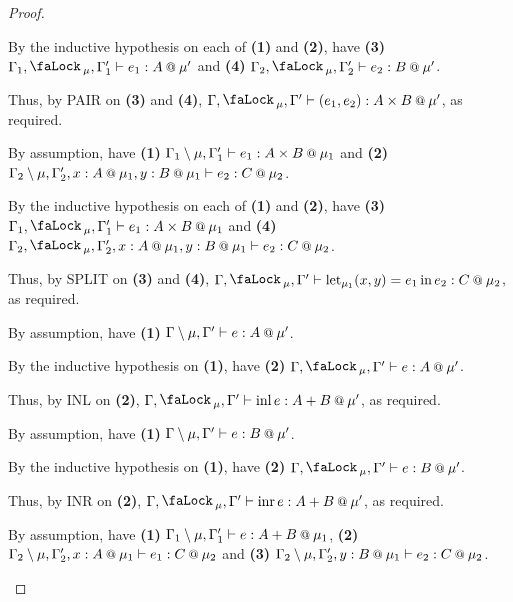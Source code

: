 \documentclass[acmsmall,screen,nonacm]{acmart}
\makeatletter
\DeclareMathOperator{\llet}{\text{let}}
\DeclareMathOperator{\lin}{\text{in}}
\newcommand{\at}{\mathbin{\mbox{\small\ensuremath{@}}}}
\DeclareMathOperator{\inl}{\text{inl}}
\DeclareMathOperator{\inr}{\text{inr}}
\newcommand{\tee}{\vdash}
\DeclareMathOperator{\lock}{\tikz{\node[scale=1, line width=0pt, inner sep=0pt] at (0,0) {\faLock\,};}}
\makeatother
\begin{document}
\begin{proof}
\begin{description}
    By the inductive hypothesis on each of \textbf{(1)} and \textbf{(2)}, have \textbf{(3)} $\Gamma_1, \lock_\mu, \Gamma^\prime_1 \tee e_1 : A \at \mu^\prime$ and \textbf{(4)} $\Gamma_2, \lock_\mu, \Gamma^\prime_2 \tee e_2 : B \at \mu^\prime$. 
    
    Thus, by PAIR on \textbf{(3)} and \textbf{(4)}, $\Gamma, \lock_\mu, \Gamma^\prime \tee (e_1, e_2) : A \times B \at \mu^\prime$, as required.
    \\
    \item[Case SPLIT.]
    By assumption, have \textbf{(1)} $\Gamma_1 \setminus \mu, \Gamma^\prime_1 \tee e_1 : A \times B \at \mu_1$ and \textbf{(2)} $\Gamma_2 \setminus \mu, \Gamma^\prime_2, x : A \at \mu_1, y : B \at \mu_1 \tee e_2 : C \at \mu_2$. 
    
    By the inductive hypothesis on each of \textbf{(1)} and \textbf{(2)}, have \textbf{(3)} $\Gamma_1, \lock_\mu, \Gamma^\prime_1 \tee e_1 : A \times B \at \mu_1$ and \textbf{(4)} $\Gamma_2, \lock_\mu, \Gamma^\prime_2, x : A \at \mu_1, y : B \at \mu_1 \tee e_2 : C \at \mu_2$. 
    
    Thus, by SPLIT on \textbf{(3)} and \textbf{(4)}, $\Gamma, \lock_\mu, \Gamma^\prime \tee \llet_{\mu_1} (x, y) = e_1 \lin e_2 : C \at \mu_2$, as required.
    \\
    \item[Case INL.]
    By assumption, have \textbf{(1)} $\Gamma \setminus \mu, \Gamma^\prime \tee e : A \at \mu^\prime$. 
    
    By the inductive hypothesis on \textbf{(1)}, have \textbf{(2)} $\Gamma, \lock_\mu, \Gamma^\prime \tee e : A \at \mu^\prime$. 
    
    Thus, by INL on \textbf{(2)}, $\Gamma, \lock_\mu, \Gamma^\prime \tee \inl e : A + B \at \mu^\prime$, as required.
    \\
    \item[Case INR.]
    By assumption, have \textbf{(1)} $\Gamma \setminus \mu, \Gamma^\prime \tee e : B \at \mu^\prime$. 
    
    By the inductive hypothesis on \textbf{(1)}, have \textbf{(2)} $\Gamma, \lock_\mu, \Gamma^\prime \tee e : B \at \mu^\prime$. 
    
    Thus, by INR on \textbf{(2)}, $\Gamma, \lock_\mu, \Gamma^\prime \tee \inr e : A + B \at \mu^\prime$, as required.
    \\
    \item[Case CASE.]
    By assumption, have \textbf{(1)} $\Gamma_1 \setminus \mu, \Gamma^\prime_1 \tee e : A + B \at \mu_1$, \textbf{(2)} $\Gamma_2 \setminus \mu, \Gamma^\prime_2, x : A \at \mu_1 \tee e_1 : C \at \mu_2$ and \textbf{(3)} $\Gamma_2 \setminus \mu, \Gamma^\prime_2, y : B \at \mu_1 \tee e_2 : C \at \mu_2$. 
    

\end{description}
\end{proof}
\end{document}
